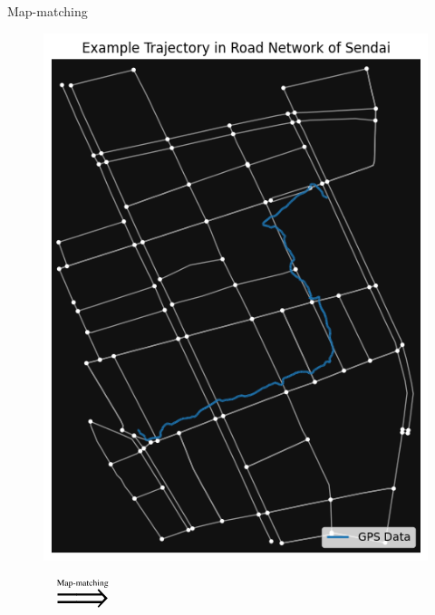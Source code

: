 \documentclass[aspectratio=169, bigfiles, professionalfonts, hyperref={colorlinks=true, allcolors=., urlcolor=blue}]{beamer}
\begin{document}
\begin{frame}{Map-matching}

\begin{figure}
\centering
\begin{minipage}{.4\textwidth}
\centering
  \includegraphics[scale=.45]{trajectoryandroads.png}
  \label{fig:example_traj}
\end{minipage}%
$\overset{\text{Map-matching}}{\scalebox{3}{$\implies$}}$
\begin{minipage}{.4\textwidth}
\centering

\end{minipage}
\end{figure}
\end{frame}
\end{document}
